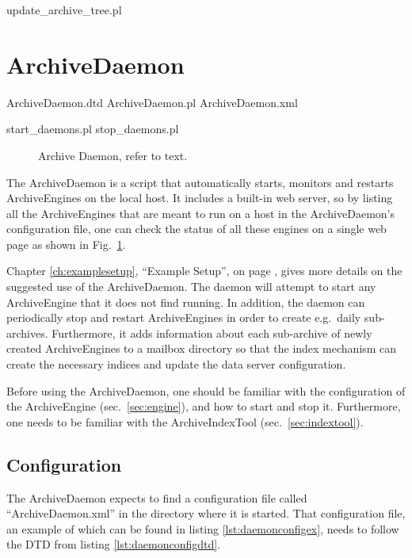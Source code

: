 update\_archive\_tree.pl

\section{ArchiveDaemon} \label{sec:daemon}
ArchiveDaemon.dtd
ArchiveDaemon.pl
ArchiveDaemon.xml

start\_daemons.pl
stop\_daemons.pl

\begin{figure}[htb]
\begin{center}
\end{center}
\caption{\label{fig:daemon}Archive Daemon, refer to text.}
\end{figure}

\noindent The ArchiveDaemon is a script that automatically starts,
monitors and restarts ArchiveEngines on the local host. It includes a
built-in web server, so by listing all the ArchiveEngines that are
meant to run on a host in the ArchiveDaemon's configuration file, one
can check the status of all these engines on a single web page as
shown in Fig.~\ref{fig:daemon}.

Chapter \ref{ch:examplesetup}, ``Example Setup'', on page
\pageref{ch:examplesetup}, gives more details on the suggested use of
the ArchiveDaemon. The daemon will attempt to start any ArchiveEngine
that it does not find running. In addition, the daemon can
periodically stop and restart ArchiveEngines in order to create
e.g.\ daily sub-archives.  Furthermore, it adds information about
each sub-archive of newly created ArchiveEngines to a mailbox directory
so that the index mechanism can create the necessary indices
and update the data server configuration.

Before using the ArchiveDaemon, one should be familiar
with the configuration of the ArchiveEngine (sec.\ \ref{sec:engine}),
and how to start and stop it. Furthermore, one needs to be familiar
with the ArchiveIndexTool (sec.\ \ref{sec:indextool}).

\subsection{Configuration}
The ArchiveDaemon expects to find a configuration file called
``ArchiveDaemon.xml'' in the directory where it is started.  That
configuration file, an example of which can be found in listing
\ref{lst:daemonconfigex}, needs to follow the DTD from listing
\ref{lst:daemonconfigdtd}.


